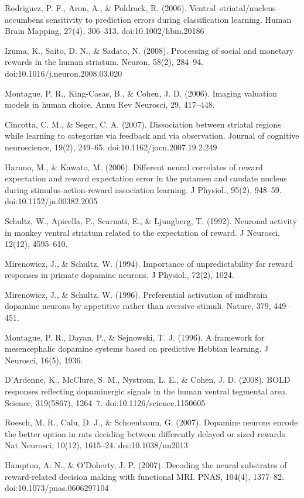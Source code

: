 Rodriguez, P. F., Aron, A., & Poldrack, R. (2006). Ventral–striatal/nucleus–accumbens sensitivity to prediction errors during classification learning. Human Brain Mapping, 27(4), 306–313. doi:10.1002/hbm.20186

Izuma, K., Saito, D. N., & Sadato, N. (2008). Processing of social and monetary rewards in the human striatum. Neuron, 58(2), 284–94. doi:10.1016/j.neuron.2008.03.020

Montague, P. R., King-Casas, B., & Cohen, J. D. (2006). Imaging valuation models in human choice. Annu Rev Neurosci, 29, 417–448.

Cincotta, C. M., & Seger, C. A. (2007). Dissociation between striatal regions while learning to categorize via feedback and via observation. Journal of cognitive neuroscience, 19(2), 249–65. doi:10.1162/jocn.2007.19.2.249

Haruno, M., & Kawato, M. (2006). Different neural correlates of reward expectation and reward expectation error in the putamen and caudate nucleus during stimulus-action-reward association learning. J Physiol., 95(2), 948–59. doi:10.1152/jn.00382.2005

Schultz, W., Apicella, P., Scarnati, E., & Ljungberg, T. (1992). Neuronal activity in monkey ventral striatum related to the expectation of reward. J Neurosci, 12(12), 4595–610.

Mirenowicz, J., & Schultz, W. (1994). Importance of unpredictability for reward responses in primate dopamine neurons. J Physiol., 72(2), 1024.

Mirenowicz, J., & Schultz, W. (1996). Preferential activation of midbrain dopamine neurons by appetitive rather than aversive stimuli. Nature, 379, 449–451.

Montague, P. R., Dayan, P., & Sejnowski, T. J. (1996). A framework for mesencephalic dopamine systems based on predictive Hebbian learning. J Neurosci, 16(5), 1936.

D'Ardenne, K., McClure, S. M., Nystrom, L. E., & Cohen, J. D. (2008). BOLD responses reflecting dopaminergic signals in the human ventral tegmental area. Science, 319(5867), 1264–7. doi:10.1126/science.1150605

Roesch, M. R., Calu, D. J., & Schoenbaum, G. (2007). Dopamine neurons encode the better option in rats deciding between differently delayed or sized rewards. Nat Neurosci, 10(12), 1615–24. doi:10.1038/nn2013

Hampton, A. N., & O'Doherty, J. P. (2007). Decoding the neural substrates of reward-related decision making with functional MRI. PNAS, 104(4), 1377–82. doi:10.1073/pnas.0606297104


